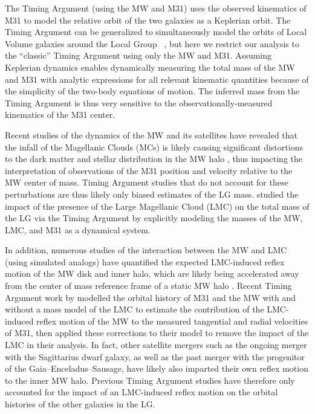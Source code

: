 \documentclass[twocolumn]{aastex631}
\begin{document}
The Timing Argument (using the MW and M31) uses the observed kinematics of M31
to model the relative orbit of the two galaxies as a Keplerian orbit.
The Timing Argument can be generalized to simultaneously model the orbits of
Local Volume galaxies around the Local Group
~\citep{Penarrubia2016, Penarrubia2017}, but here we restrict our analysis to
the ``classic'' Timing Argument using only the MW and M31.
Assuming Keplerian dynamics enables dynamically measuring the total mass of the
MW and M31 with analytic expressions for all relevant kinematic quantities
because of the simplicity of the two-body equations of motion.
The inferred mass from the Timing Argument is thus very sensitive to the
observationally-measured kinematics of the M31 center.

Recent studies of the dynamics of the MW and its satellites have
revealed that the infall of the Magellanic Clouds (MCs) is likely causing
significant distortions to the dark matter and stellar distribution in the MW
halo \citep{Laporte:2018a, Laporte:2018b, Garavito-Camargo:2019, Conroy:2021,
Erkal:2021}, thus impacting the interpretation of observations of the M31
position and velocity relative to the MW center of mass.
Timing Argument studies that do not account for these perturbations are thus
likely only biased estimates of the LG mass.
\citet{Penarrubia2016} studied the impact of the presence of the Large
Magellanic Cloud (LMC) on the total mass of the LG via the Timing Argument by
explicitly modeling the masses of the MW, LMC, and M31 as a dynamical system. 

In addition, numerous studies of the interaction between the MW and LMC (using
simulated analogs) have quantified the expected LMC-induced reflex motion of the
MW disk and inner halo, which are likely being accelerated away from the center
of mass reference frame of a static MW halo \citep{Gomez2015, Cunningham:2020,
Petersen:2020, Garavito-Camargo2021b}.
Recent Timing Argument work by \cite{Benisty2022} modelled the orbital history
of M31 and the MW with and without a mass model of the LMC to estimate the
contribution of the LMC-induced reflex motion of the MW to the measured
tangential and radial velocities of M31, then applied these corrections to their
model to remove the impact of the LMC in their analysis.
In fact, other satellite mergers such as the ongoing merger with the Sagittarius
dwarf galaxy, as well as the past merger with the progenitor of the
Gaia--Enceladus--Sausage, have likely also imparted their own reflex motion to
the inner MW halo.
Previous Timing Argument studies have therefore only accounted for the impact of
an LMC-induced reflex motion on the orbital histories of the other galaxies in
the LG.
\end{document}
